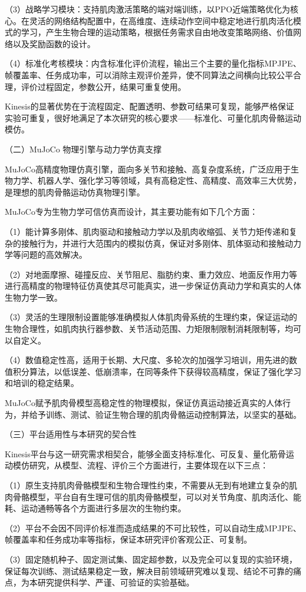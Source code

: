 （3）战略学习模块：支持肌肉激活策略的端对端训练，以PPO近端策略优化为核心。在灵活的网络结构配置中，在高维度、连续动作空间中稳定地进行肌肉活化模式的学习，产生生物合理的运动策略，根据任务需求自由地改变策略网络、价值网络以及奖励函数的设计。

（4）标准化考核模块：内含标准化评价流程，输出三个主要的量化指标MPJPE、帧覆盖率、任务成功率，可以消除主观评价差异，使不同算法之间横向比较公平合理，评价过程固定，参数公开，结果可重复使用。

Kinesis的显著优势在于流程固定、配置透明、参数可结果可复现，能够严格保证实验可重复，很好地满足了本次研究的核心要求——标准化、可量化肌肉骨骼运动模仿。

（二）MuJoCo 物理引擎与动力学仿真支撑

MuJoCo高精度物理仿真引擎，面向多关节和接触、高复杂度系统，广泛应用于生物力学、机器人学、强化学习等领域，具有高稳定性、高精度、高效率三大优势，是理想的肌肉骨骼运动仿真物理引擎。

MuJoCo专为生物力学可信仿真而设计，其主要功能有如下几个方面：

（1）能计算多刚体、肌肉驱动和接触动力学以及肌肉收缩弧、关节力矩传递和复杂的接触行为，并进行大范围内的模拟仿真，保证对多刚体、肌体驱动和接触动力学等问题的高效解决。

（2）对地面摩擦、碰撞反应、关节阻尼、脂肪约束、重力效应、地面反作用力等进行高精度的物理特征仿真使其尽可能真实，进一步保证仿真动力学和真实的人体生物力学一致。

（3）灵活的生理限制设置能够准确模拟人体肌肉骨系统的生理约束，保证运动的生物合理性，如肌肉执行器参数、关节活动范围、力矩限制限制消耗限制等，均可以自定义。

（4）数值稳定性高，适用于长期、大尺度、多轮次的加强学习培训，用先进的数值积分算法，以低误差、低崩溃率，在同等条件下获得较高精度，保证了强化学习和培训的稳定结果。

MuJoCo赋予肌肉骨模型高稳定性的物理模拟，保证仿真运动接近真实的人体行为，并给予训练、测试、验证生物合理的肌肉骨骼运动控制算法，以坚实的基础。

（三）平台适用性与本研究的契合性

Kinesis平台与这一研究需求相契合，能够全面支持标准化、可反复、量化筋骨运动模仿研究，从模型、流程、评价三个方面进行，主要体现在以下三点：

（1）原生支持肌肉骨骼模型和生物合理性约束，不需要从无到有地建立复杂的肌肉骨骼模型，平台自有生理可信的肌肉骨骼模型，可以对关节角度、肌肉活化、能耗、运动通畅等各个方面进行多层次的生物约束。

（2）平台不会因不同评价标准而造成结果的不可比较性，可以自动生成MPJPE、帧覆盖率和任务成功率等指标，保证本研究评价客观公正、可复制。

（3）固定随机种子、固定测试集、固定超参数，以及完全可以复现的实验环境，保证每次训练、测试结果稳定一致，解决目前领域研究难以复现、结论不可靠的痛点，为本研究提供科学、严谨、可验证的实验基础。
